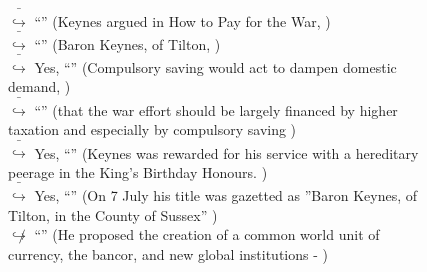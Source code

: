 \documentclass[11pt,a4paper, onecolumn]{article}
\begin{document}
\begin{figure}[t] \small \begin{tcolorbox}[boxsep=0pt,left=5pt,right=0pt,top=2pt,colback = yellow!5] \begin{dialogue}
 \small 
\colorbox{pink!25}{ $\bar{\hookrightarrow}$}
{ ``'' (Keynes argued in How to Pay for the War, ) }
\\
\colorbox{pink!25}{ $\bar{\hookrightarrow}$}
{ ``'' (Baron Keynes, of Tilton, ) }
\\
\colorbox{pink!25}{ $\bar{\hookrightarrow}$}
\colorbox{red!25}{Yes,}
{ ``'' (Compulsory saving would act to dampen domestic demand, ) }
\\
\colorbox{pink!25}{ $\bar{\hookrightarrow}$}
{ ``'' (that the war effort should be largely financed by higher taxation and especially by compulsory saving ) }
\\
\colorbox{pink!25}{ $\bar{\hookrightarrow}$}
\colorbox{red!25}{Yes,}
{ ``'' (Keynes was rewarded for his service with a hereditary peerage in the King's Birthday Honours. ) }
\\
\colorbox{pink!25}{ $\bar{\hookrightarrow}$}
\colorbox{red!25}{Yes,}
{ ``'' (On 7 July his title was gazetted as ''Baron Keynes, of Tilton, in the County of Sussex'' ) }
\\
\colorbox{pink!25}{$\not\hookrightarrow$}
{ ``'' (He proposed the creation of a common world unit of currency, the bancor, and new global institutions - ) }
\\
 \end{dialogue}\end{tcolorbox}\end{figure}
\end{document}
